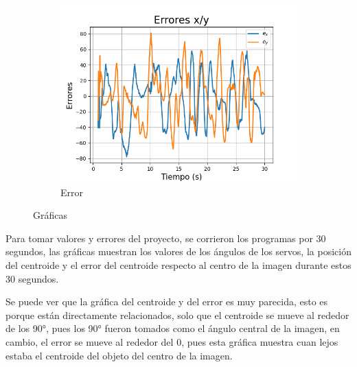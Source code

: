 \documentclass[12pt, oneside]{article}
\begin{document}
{\begin{figure}[h!]
\begin{subfigure}{0.4\textwidth}
            \centering
            \includegraphics[width=\linewidth]{error.png}
            \caption{\sffamily Error}
        \end{subfigure}

        \caption{\sffamily Gráficas}
        \label{fig:graficas}
    \end{figure}

    \hspace{0.5cm} Para tomar valores y errores del proyecto, se corrieron los programas
    por 30 segundos, las gráficas muestran los valores de los ángulos de los servos, la
    posición del centroide y el error del centroide respecto al centro de la imagen
    durante estos 30 segundos.

    \hspace{0.5cm} Se puede ver que la gráfica del centroide y del error es muy
    parecida, esto es porque están directamente relacionados, solo que el centroide se
    mueve al rededor de los 90°, pues los 90° fueron tomados como el ángulo central de
    la imagen, en cambio, el error se mueve al rededor del $0$, pues esta gráfica
    muestra cuan lejos estaba el centroide del objeto del centro de la imagen.

}

\newpage
\end{document}
